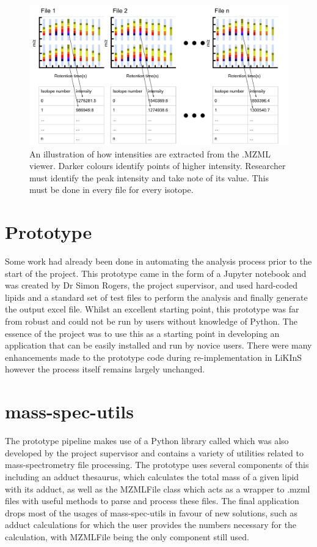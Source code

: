 \documentclass{l4proj}
\begin{document}
\begin{figure}
    \centering
    \includegraphics[width=\textwidth]{dissertation/images/ToppView Diagram (2).pdf}
    \caption{An illustration of how intensities are extracted from the .MZML viewer. Darker colours identify points of higher intensity. Researcher must identify the peak intensity and take note of its value. This must be done in every file for every isotope.}
    \label{fig:toppView}
\end{figure}

\section{Prototype}
Some work had already been done in automating the analysis process prior to the start of the project. This prototype came in the form of a Jupyter notebook and was created by Dr Simon Rogers, the project supervisor, and used hard-coded lipids and a standard set of test files to perform the analysis and finally generate the output excel file. Whilst an excellent starting point, this prototype was far from robust and could not be run by users without knowledge of Python. The essence of the project was to use this as a starting point in developing an application that can be easily installed and run by novice users. There were many enhancements made to the prototype code during re-implementation in LiKInS however the process itself remains largely unchanged. 


\section{mass-spec-utils}
The prototype pipeline makes use of a Python library called  which was also developed by the project supervisor and contains a variety of utilities related to mass-spectrometry file processing. The prototype uses several components of this including an adduct thesaurus, which calculates the total mass of a given lipid with its adduct, as well as the MZMLFile class which acts as a wrapper to .mzml files with useful methods to parse and process these files. The final application drops most of the usages of mass-spec-utils in favour of new solutions, such as adduct calculations for which the user provides the numbers necessary for the calculation, with MZMLFile being the only component still used.
\end{document}
